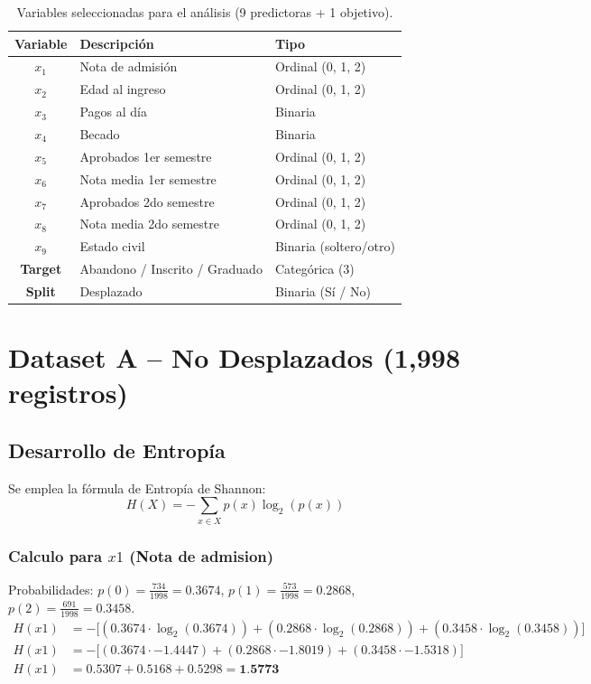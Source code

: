 \documentclass[12pt,a4paper]{article}
\begin{document}
\begin{table}[H]
    \centering
    \begin{tabular}{cll}
        \toprule
        \textbf{Variable} & \textbf{Descripción} & \textbf{Tipo} \\
        \midrule
        $x_1$ & Nota de admisión & Ordinal (0, 1, 2) \\
        $x_2$ & Edad al ingreso & Ordinal (0, 1, 2) \\
        $x_3$ & Pagos al día & Binaria \\
        $x_4$ & Becado & Binaria \\
        $x_5$ & Aprobados 1er semestre & Ordinal (0, 1, 2) \\
        $x_6$ & Nota media 1er semestre & Ordinal (0, 1, 2) \\
        $x_7$ & Aprobados 2do semestre & Ordinal (0, 1, 2) \\
        $x_8$ & Nota media 2do semestre & Ordinal (0, 1, 2) \\
        $x_9$ & Estado civil & Binaria (soltero/otro) \\
        \midrule
        \textbf{Target} & Abandono / Inscrito / Graduado & Categórica (3) \\
        \midrule
        \textbf{Split} & Desplazado & Binaria (Sí / No) \\
        \bottomrule
    \end{tabular}
    \caption{Variables seleccionadas para el análisis (9 predictoras + 1 objetivo).}
\end{table}

\section{Dataset A -- No Desplazados (1,998 registros)}

\subsection{Desarrollo de Entropía}

Se emplea la fórmula de Entropía de Shannon:
\begin{equation}
    H(X) = -\sum_{x \in X} p(x)\log_2(p(x))
\end{equation}


\subsubsection{Calculo para $x1$ (Nota de admision)}
Probabilidades: $p(0) = \frac{734}{1998} = 0.3674$, $p(1) = \frac{573}{1998} = 0.2868$, $p(2) = \frac{691}{1998} = 0.3458$.
\begin{align*}
    H(x1) &= -\big[ (0.3674 \cdot \log_2(0.3674)) + (0.2868 \cdot \log_2(0.2868)) + (0.3458 \cdot \log_2(0.3458)) \big] \\
    H(x1) &= -\big[ (0.3674 \cdot -1.4447) + (0.2868 \cdot -1.8019) + (0.3458 \cdot -1.5318) \big] \\
    H(x1) &= 0.5307 + 0.5168 + 0.5298 = \textbf{1.5773}
\end{align*}
\end{document}
